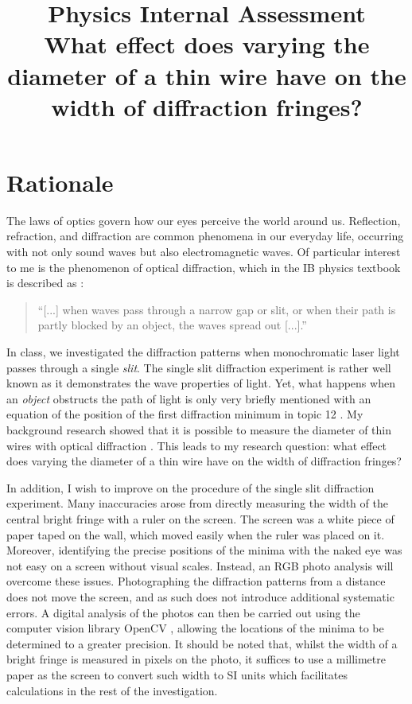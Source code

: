 \documentclass[a4paper, 12pt]{article}
\title{
\textbf{Physics Internal Assessment}\\
\bigskip
What effect does varying the diameter of a thin wire have on the width of diffraction fringes?
}
\author{}
\date{}
\begin{document}
\maketitle

\section{Rationale}
The laws of optics govern how our eyes perceive the world around us. 
Reflection, refraction, and diffraction are common phenomena in our everyday life, occurring with not only sound waves but also electromagnetic waves. 
Of particular interest to me is the phenomenon of optical diffraction, which in the IB physics textbook is described as \autocite[151]{textbook}: 
\begin{quote}
``[...] when waves pass through a narrow gap or slit, or when their path is partly blocked by an object, the waves spread out [...].''    
\end{quote}

In class, we investigated the diffraction patterns when monochromatic laser light passes through a single \textit{slit}. 
The single slit diffraction experiment is rather well known as it demonstrates the wave properties of light. 
Yet, what happens when an \textit{object} obstructs the path of light is only very briefly mentioned with an equation of the position of the first diffraction minimum in topic 12 \autocite[495]{textbook}. 
My background research showed that it is possible to measure the diameter of thin wires with optical diffraction \autocite{wire_measurement}. 
This leads to my research question: 
what effect does varying the diameter of a thin wire have on the width of diffraction fringes?

In addition, I wish to improve on the procedure of the single slit diffraction experiment.
Many inaccuracies arose from directly measuring the width of the central bright fringe with a ruler on the screen.
The screen was a white piece of paper taped on the wall, which moved easily when the ruler was placed on it. 
Moreover, identifying the precise positions of the minima with the naked eye was not easy on a screen without visual scales.
Instead, an RGB photo analysis will overcome these issues.
Photographing the diffraction patterns from a distance does not move the screen, and as such does not introduce additional systematic errors.
A digital analysis of the photos can then be carried out using the computer vision library OpenCV \autocite{opencv_library}, allowing the locations of the minima to be determined to a greater precision.
It should be noted that, whilst the width of a bright fringe is measured in pixels on the photo, it suffices to use a millimetre paper as the screen to convert such width to SI units which facilitates calculations in the rest of the investigation.
\end{document}
